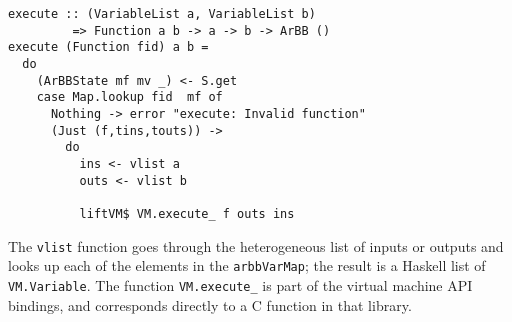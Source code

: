 \begin{verbatim} 
execute :: (VariableList a, VariableList b) 
         => Function a b -> a -> b -> ArBB ()       
execute (Function fid) a b = 
  do 
    (ArBBState mf mv _) <- S.get 
    case Map.lookup fid  mf of 
      Nothing -> error "execute: Invalid function" 
      (Just (f,tins,touts)) -> 
        do 
          ins <- vlist a 
          outs <- vlist b
          
          liftVM$ VM.execute_ f outs ins 
\end{verbatim} 


The {\tt vlist} function goes through the heterogeneous list of inputs or outputs 
and looks up each of the elements in the {\tt arbbVarMap}; the result is a Haskell 
list of {\tt VM.Variable}. The function {\tt VM.execute\_} is part of the virtual 
machine API bindings, and corresponds directly to a C function in that library. 






\FloatBarrier

